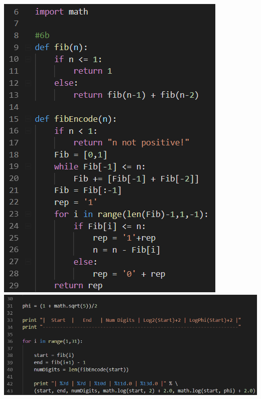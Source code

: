 \documentclass[a4paper]{article}
\begin{document}
\begin{enumerate}[label=\alph*)]
        \includegraphics[scale=0.7]{6b0}\\
        \includegraphics[scale=0.7]{6b1}
        
    
    \end{enumerate}
\end{document}

